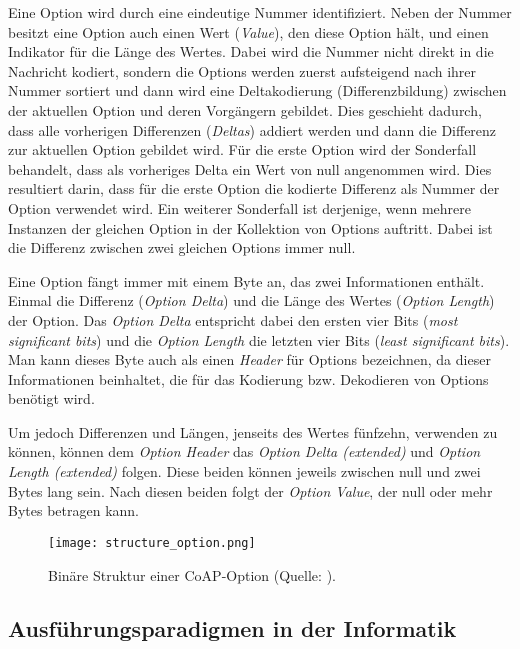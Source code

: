 Eine Option wird durch eine eindeutige Nummer identifiziert. Neben der Nummer besitzt eine Option auch einen Wert (\textit{Value}), den diese Option hält, und einen Indikator für die Länge des Wertes. Dabei wird die Nummer nicht direkt in die Nachricht kodiert, sondern die Options werden zuerst aufsteigend nach ihrer Nummer sortiert und dann wird eine Deltakodierung (Differenzbildung) zwischen der aktuellen Option und deren Vorgängern gebildet. Dies geschieht dadurch, dass alle vorherigen Differenzen (\textit{Deltas}) addiert werden und dann die Differenz zur aktuellen Option gebildet wird. Für die erste Option wird der Sonderfall behandelt, dass als vorheriges Delta ein Wert von null angenommen wird. Dies resultiert darin, dass für die erste Option die kodierte Differenz als Nummer der Option verwendet wird. Ein weiterer Sonderfall ist derjenige, wenn mehrere Instanzen der gleichen Option in der Kollektion von Options auftritt. Dabei ist die Differenz zwischen zwei gleichen Options immer null.

Eine Option fängt immer mit einem Byte an, das zwei Informationen enthält. Einmal die Differenz (\textit{Option Delta}) und die Länge des Wertes (\textit{Option Length}) der Option. Das \textit{Option Delta} entspricht dabei den ersten vier Bits (\textit{most significant bits}) und die \textit{Option Length} die letzten vier Bits (\textit{least significant bits}). Man kann dieses Byte auch als einen \textit{Header} für Options bezeichnen, da dieser Informationen beinhaltet, die für das Kodierung bzw. Dekodieren von Options benötigt wird.

Um jedoch Differenzen und Längen, jenseits des Wertes fünfzehn, verwenden zu können, können dem \textit{Option Header} das \textit{Option Delta (extended)} und \textit{Option Length (extended)} folgen. Diese beiden können jeweils zwischen null und zwei Bytes lang sein. Nach diesen beiden folgt der \textit{Option Value}, der null oder mehr Bytes betragen kann.

\begin{figure}[h]
    \centering
    \texttt{[image: structure\_option.png]}
    \caption{Binäre Struktur einer CoAP-Option (Quelle: \autocite{RFC7252}).}
    \label{fig:binaere-sturktur-einer-coap-option}
\end{figure}

\subsection{Ausführungsparadigmen in der Informatik}
\label{subsubsec:ausfuehrungsparadigmen-in-der-informatik}

